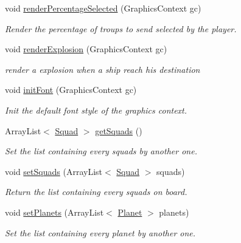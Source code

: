 \begin{DoxyCompactItemize}
void \hyperlink{classfr_1_1projet_1_1groupe40_1_1model_1_1board_1_1_galaxy_a1785a032d6611d092033ff81e0b688d2}{render\+Percentage\+Selected} (Graphics\+Context gc)
\begin{DoxyCompactList}\small\item\em Render the percentage of troups to send selected by the player. \end{DoxyCompactList}\item 
void \hyperlink{classfr_1_1projet_1_1groupe40_1_1model_1_1board_1_1_galaxy_a3997b2f9daacabfa4ceb38b129f56f3e}{render\+Explosion} (Graphics\+Context gc)
\begin{DoxyCompactList}\small\item\em render a explosion when a ship reach his destination \end{DoxyCompactList}\item 
void \hyperlink{classfr_1_1projet_1_1groupe40_1_1model_1_1board_1_1_galaxy_a6f31adbe336406cbc701d769ac03d0b8}{init\+Font} (Graphics\+Context gc)
\begin{DoxyCompactList}\small\item\em Init the default font style of the graphics context. \end{DoxyCompactList}\item 
Array\+List$<$ \hyperlink{classfr_1_1projet_1_1groupe40_1_1model_1_1ships_1_1_squad}{Squad} $>$ \hyperlink{classfr_1_1projet_1_1groupe40_1_1model_1_1board_1_1_galaxy_a22d431ce871b313fbeb72004e2fbcac8}{get\+Squads} ()
\begin{DoxyCompactList}\small\item\em Set the list containing every squads by another one. \end{DoxyCompactList}\item 
void \hyperlink{classfr_1_1projet_1_1groupe40_1_1model_1_1board_1_1_galaxy_afdfdd3a32fa34be534eb436d4fd70788}{set\+Squads} (Array\+List$<$ \hyperlink{classfr_1_1projet_1_1groupe40_1_1model_1_1ships_1_1_squad}{Squad} $>$ squads)
\begin{DoxyCompactList}\small\item\em Return the list containing every squads on board. \end{DoxyCompactList}\item 
void \hyperlink{classfr_1_1projet_1_1groupe40_1_1model_1_1board_1_1_galaxy_a22ae6c3d0f709f614e232d3122c7b9b4}{set\+Planets} (Array\+List$<$ \hyperlink{classfr_1_1projet_1_1groupe40_1_1model_1_1board_1_1_planet}{Planet} $>$ planets)
\begin{DoxyCompactList}\small\item\em Set the list containing every planet by another one. \end{DoxyCompactList}\item 

\end{DoxyCompactItemize}
